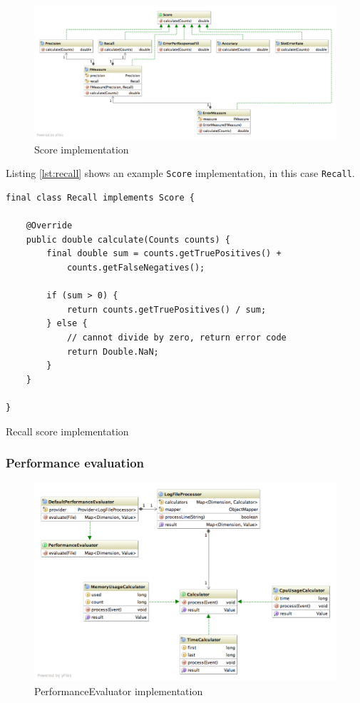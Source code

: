 \begin{figure}[H]
\centering
\includegraphics[width=\textwidth]{score.png}
\caption{Score implementation}
\end{figure}

Listing \ref{lst:recall} shows an example \texttt{Score} implementation, in this case \texttt{Recall}.

\begin{listing}[H]
\begin{verbatim}
final class Recall implements Score {

    @Override
    public double calculate(Counts counts) {
        final double sum = counts.getTruePositives() + 
            counts.getFalseNegatives();

        if (sum > 0) {
            return counts.getTruePositives() / sum;
        } else {
            // cannot divide by zero, return error code
            return Double.NaN;
        }
    }

}
\end{verbatim}
\caption{Recall score implementation}
\label{lst:recall}
\end{listing}

\newpage
\subsubsection{Performance evaluation}
\begin{figure}[H]
\centering
\includegraphics[width=\textwidth]{performance-evaluation.png}
\caption{PerformanceEvaluator implementation}
\end{figure}

